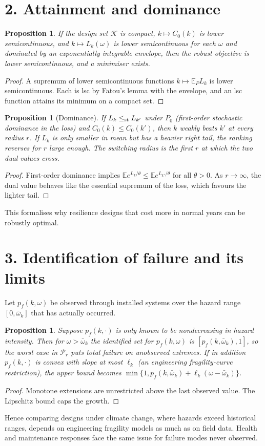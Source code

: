 \documentclass[11pt]{article}
\newtheorem{proposition}[theorem]{Proposition}
\theoremstyle{definition}
\begin{document}
\section*{2. Attainment and dominance}
\begin{proposition}\label{prop:att}
If the design set $\mathcal K$ is compact, $k\mapsto C_0(k)$ is lower semicontinuous, and $k\mapsto L_k(\omega)$ is lower
semicontinuous for each $\omega$ and dominated by an exponentially integrable envelope, then the robust objective is lower
semicontinuous, and a minimiser exists.
\end{proposition}
\begin{proof}
A supremum of lower semicontinuous functions $k\mapsto\mathbb E_PL_k$ is lower semicontinuous. Each is lsc by Fatou's lemma
with the envelope, and an lsc function attains its minimum on a compact set.
\end{proof}
\begin{proposition}[Dominance]\label{prop:dom}
If $L_k\le_{\rm st}L_{k'}$ under $P_0$ (first-order stochastic dominance in the loss) and $C_0(k)\le C_0(k')$, then $k$
weakly beats $k'$ at every radius $r$. If $L_k$ is only smaller in mean but has a heavier right tail, the ranking reverses for
$r$ large enough. The switching radius is the first $r$ at which the two dual values cross.
\end{proposition}
\begin{proof}
First-order dominance implies $\mathbb Ee^{L_k/\theta}\le\mathbb Ee^{L_{k'}/\theta}$ for all $\theta>0$. As $r\to\infty$,
the dual value behaves like the essential supremum of the loss, which favours the lighter tail.
\end{proof}
This formalises why resilience designs that cost more in normal years can be robustly optimal.

\section*{3. Identification of failure and its limits}
Let $p_f(k,\omega)$ be observed through installed systems over the hazard range $[0,\bar\omega_k]$ that has actually occurred.
\begin{proposition}\label{prop:extrap}
Suppose $p_f(k,\cdot)$ is only known to be nondecreasing in hazard intensity. Then for $\omega>\bar\omega_k$ the identified set for
$p_f(k,\omega)$ is $[p_f(k,\bar\omega_k),1]$, so the worst case in $\mathcal P_r$ puts total failure on unobserved extremes.
If in addition $p_f(k,\cdot)$ is convex with slope at most $\ell_k$ (an engineering fragility-curve restriction), the
upper bound becomes $\min\{1,p_f(k,\bar\omega_k)+\ell_k(\omega-\bar\omega_k)\}$.
\end{proposition}
\begin{proof}
Monotone extensions are unrestricted above the last observed value. The Lipschitz bound caps the growth.
\end{proof}
Hence comparing designs under climate change, where hazards exceed historical ranges, depends on engineering fragility
models as much as on field data. Health and maintenance responses face the same issue for failure modes never observed.
\end{document}
